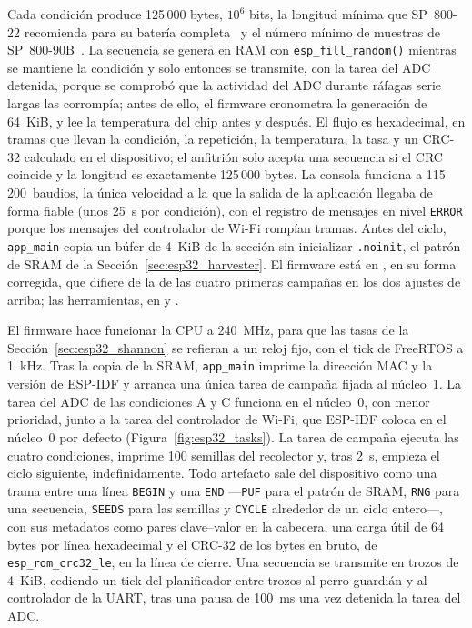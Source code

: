 Cada condición produce 125\,000 bytes, $10^6$ bits, la longitud mínima que
SP~800-22 recomienda para su batería completa~\cite{bassham_2010_sp80022} y
el número mínimo de muestras de SP~800-90B~\cite{turan_2018_sp80090b}. La
secuencia se genera en RAM con \texttt{esp\_fill\_random()} mientras se
mantiene la condición y solo entonces se transmite, con la tarea del ADC
detenida, porque se comprobó que la actividad del ADC durante ráfagas
serie largas las corrompía; antes de ello, el firmware cronometra la
generación de 64~KiB, y lee la temperatura del chip antes y después. El
flujo es hexadecimal, en tramas que llevan la condición, la repetición,
la temperatura, la tasa y un CRC-32 calculado en el dispositivo; el
anfitrión solo acepta una secuencia si el CRC coincide y la longitud es
exactamente 125\,000 bytes. La consola funciona a 115\,200~baudios, la
única velocidad a la que la salida de la aplicación llegaba de forma
fiable (unos 25~s por condición), con el registro de mensajes en nivel
\texttt{ERROR} porque los mensajes del controlador de Wi-Fi rompían
tramas. Antes del ciclo, \texttt{app\_main} copia un búfer de 4~KiB de la
sección sin inicializar \texttt{.noinit}, el patrón de SRAM de la
Sección~\ref{sec:esp32_harvester}. El firmware está en
, en su forma corregida, que difiere de la de
las cuatro primeras campañas en los dos ajustes de arriba; las
herramientas, en 
y .

El firmware hace funcionar la CPU a 240~MHz, para que las tasas de la
Sección~\ref{sec:esp32_shannon} se refieran a un reloj fijo, con el tick
de FreeRTOS a 1~kHz. Tras la copia de la SRAM, \texttt{app\_main} imprime
la dirección MAC y la versión de ESP-IDF y arranca una única tarea de
campaña fijada al núcleo~1. La tarea del ADC de las condiciones A y C
funciona en el núcleo~0, con menor prioridad, junto a la tarea del
controlador de Wi-Fi, que ESP-IDF coloca en el núcleo~0 por defecto
(Figura~\ref{fig:esp32_tasks}). La tarea de campaña ejecuta las cuatro
condiciones, imprime 100 semillas del recolector y, tras 2~s, empieza el
ciclo siguiente, indefinidamente. Todo artefacto sale del dispositivo
como una trama entre una línea \texttt{BEGIN} y una \texttt{END}
---\texttt{PUF} para el patrón de SRAM, \texttt{RNG} para una secuencia,
\texttt{SEEDS} para las semillas y \texttt{CYCLE} alrededor de un ciclo
entero---, con sus metadatos como pares clave--valor en la cabecera, una
carga útil de 64 bytes por línea hexadecimal y el CRC-32 de los bytes en
bruto, de \texttt{esp\_rom\_crc32\_le}, en la línea de cierre. Una
secuencia se transmite en trozos de 4~KiB, cediendo un tick del
planificador entre trozos al perro guardián y al controlador de la UART,
tras una pausa de 100~ms una vez detenida la tarea del ADC.

